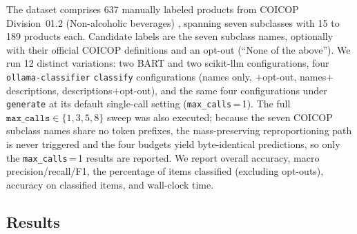 \documentclass[11pt,a4paper]{article}
\begin{document}
The dataset comprises 637 manually labeled products from COICOP Division~01.2
(Non-alcoholic beverages) \citep{nunes2025rac}, spanning seven subclasses
with 15 to 189 products each. Candidate labels are the seven subclass names,
optionally with their official COICOP definitions and an opt-out (``None of
the above''). We run 12 distinct variations: two BART and two scikit-llm
configurations, four \texttt{ollama-classifier} \texttt{classify}
configurations (names only, $+$opt-out, names$+$descriptions,
descriptions$+$opt-out), and the same four configurations under \texttt{generate}
at its default single-call setting (\texttt{max\_calls}\,=\,1). The full
$\texttt{max\_calls}\in\{1,3,5,8\}$ sweep was also executed; because the seven
COICOP subclass names share no token prefixes, the mass-preserving
reproportioning path is never triggered and the four budgets yield byte-identical
predictions, so only the \texttt{max\_calls}\,=\,1 results are reported.
We report overall accuracy, macro precision/recall/F1, the percentage of
items classified (excluding opt-outs), accuracy on classified items, and
wall-clock time.

\subsection{Results}
\label{sec:results}
\end{document}
